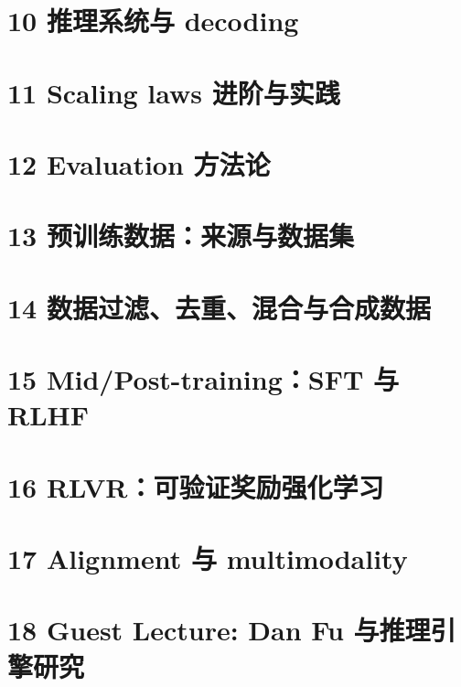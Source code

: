 \documentclass[a4paper]{article}
\begin{document}
\section{10 推理系统与 decoding}

\section{11 Scaling laws 进阶与实践}

\section{12 Evaluation 方法论}

\section{13 预训练数据：来源与数据集}

\section{14 数据过滤、去重、混合与合成数据}

\section{15 Mid/Post-training：SFT 与 RLHF}

\section{16 RLVR：可验证奖励强化学习}

\section{17 Alignment 与 multimodality}

\section{18 Guest Lecture: Dan Fu 与推理引擎研究}

\appendix
\end{document}
